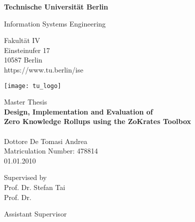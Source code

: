 \thispagestyle{empty}
\begin{center}

\vspace*{1.4cm}
{\LARGE \textbf{Technische Universität Berlin}}

\vspace{0.5cm}

{\large Information Systems Engineering\\[1mm]}

Fakultät IV\\
Einsteinufer 17\\
10587 Berlin\\
https://www.tu.berlin/ise\\

\vspace*{1cm}

\texttt{[image: tu\_logo]}

\vspace*{1.0cm}

{\LARGE Master Thesis}\\

\vspace{1.0cm}
{\LARGE \textbf{Design, Implementation and Evaluation of}}\\
\vspace*{0.2cm}
{\LARGE \textbf{Zero Knowledge Rollups using the ZoKrates Toolbox}}\\
\vspace*{0.2cm}
{\LARGE \textbf{}}\\
\vspace*{1.0cm}
{\LARGE Dottore De Tomasi Andrea}
\\
\vspace*{0.5cm}
Matriculation Number: 478814\\
01.01.2010\\ %
\vspace*{1.0cm}

Supervised by\\
Prof. Dr. Stefan Tai\\
Prof. Dr. 

\vspace*{0.5cm}
Assistant Supervisor\\
\vspace{3cm}


\end{center}


